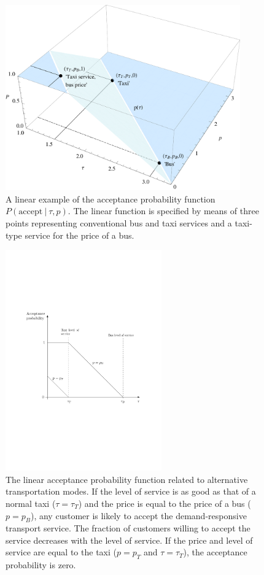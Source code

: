 \documentclass[dissertation,draft*]{aaltoseries}
\begin{document}
\begin{figure} [ht]
\begin{center}
\includegraphics[width=0.9\textwidth]{acceptanceprob01}
\caption{A linear example of the acceptance probability function $P(\mbox{accept} \ | \ \tau, p)$. The linear function is
specified by means of three points representing conventional bus and taxi services and a taxi-type service for the price of a bus. 
}
\label{acceptanceprob01}
\end{center}
\end{figure}


\begin{figure} [ht]
\begin{center}
\includegraphics[width=0.6\textwidth]{acceptanceprob2}
\caption{The linear acceptance probability function related to alternative transportation modes. 
If the level of service is as good as that of a normal taxi 
($\tau = \tau_T$) and the price is equal to the price of a bus ($p=p_B$), any customer is likely to accept the demand-responsive transport service. The fraction of customers willing to accept the service decreases with the level of service. If the price and level of service are equal to the taxi ($p=p_T$ and $\tau=\tau_T$), the acceptance probability is zero.
}
\label{acceptanceprob02}
\end{center}
\end{figure}
\end{document}
